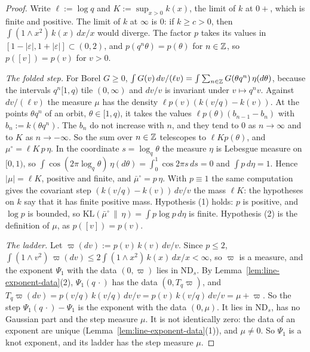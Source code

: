 \begin{proof}
\leanok
{}
Write $\ell := \log q$ and $K := \sup_{x > 0}k(x)$, the limit of $k$ at $0{+}$, which is finite
and positive. The limit of $k$ at $\infty$ is $0$: if $k \ge c > 0$, then
$\int(1 \wedge x^2)\,k(x)\,dx/x$ would diverge. The factor $p$ takes its values in
$[1 - |\varepsilon|, 1 + |\varepsilon|] \subset (0, 2)$, and $p(q^n\theta) = p(\theta)$ for
$n \in \mathbb{Z}$, so $p([v]) = p(v)$ for $v > 0$.

\emph{The folded step.} For Borel $G \ge 0$,
$\int G(v)\,dv/(\ell v) = \int\sum_{n \in \mathbb{Z}}G(\theta q^n)\,\eta(d\theta)$, because the intervals
$q^n[1,q)$ tile $(0,\infty)$ and $dv/v$ is invariant under $v \mapsto q^nv$. Against $dv/(\ell v)$
the measure $\mu$ has the density $\ell p(v)(k(v/q) - k(v))$. At the points $\theta q^n$ of an
orbit, $\theta \in [1,q)$, it takes the values $\ell p(\theta)(b_{n-1} - b_n)$ with
$b_n := k(\theta q^n)$. The $b_n$ do not increase with $n$, and they tend to $0$ as $n \to \infty$
and to $K$ as $n \to -\infty$. So the sum over $n \in \mathbb{Z}$ telescopes to $\ell Kp(\theta)$, and
$\mu^\circ = \ell K\,p\,\eta$. In the coordinate $s = \log_q\theta$ the measure $\eta$ is Lebesgue
measure on $[0,1)$, so $\int\cos(2\pi\log_q\theta)\,\eta(d\theta) = \int_0^1\cos 2\pi s\,ds = 0$
and $\int p\,d\eta = 1$. Hence $|\mu| = \ell K$, positive and finite, and $\bar\mu^\circ = p\,\eta$.
With $p \equiv 1$ the same computation gives the covariant step $(k(v/q) - k(v))\,dv/v$ the mass
$\ell K$: the hypotheses on $k$ say that it has finite positive mass. Hypothesis (1) holds: $p$ is
positive, and $\log p$ is bounded, so $\mathrm{KL}(\bar\mu^\circ \,\|\, \eta) = \int p\log p\,d\eta$
is finite. Hypothesis (2) is the definition of $\mu$, as $p([v]) = p(v)$.

\emph{The ladder.} Let $\varpi(dv) := p(v)\,k(v)\,dv/v$. Since $p \le 2$,
$\int(1 \wedge v^2)\,\varpi(dv) \le 2\int(1 \wedge x^2)\,k(x)\,dx/x < \infty$, so $\varpi$ is a
\Levy{} measure, and the exponent $\Psi_1$ with the data $(0, \varpi)$ lies in $\mathrm{ND}_s$. By
Lemma~\ref{lem:line-exponent-data}(2), $\Psi_1(q\,\cdot)$ has the data $(0, T_q\varpi)$, and
$T_q\varpi(dv) = p(v/q)\,k(v/q)\,dv/v = p(v)\,k(v/q)\,dv/v = \mu + \varpi$. So the step
$\Psi_1(q\,\cdot) - \Psi_1$ is the exponent with the data $(0, \mu)$. It lies in $\mathrm{ND}_s$,
has no Gaussian part and the step measure $\mu$. It is not identically zero: the data of an
exponent are unique (Lemma~\ref{lem:line-exponent-data}(1)), and $\mu \ne 0$. So $\Psi_1$ is a knot
exponent, and its ladder has the step measure $\mu$.


\end{proof}
